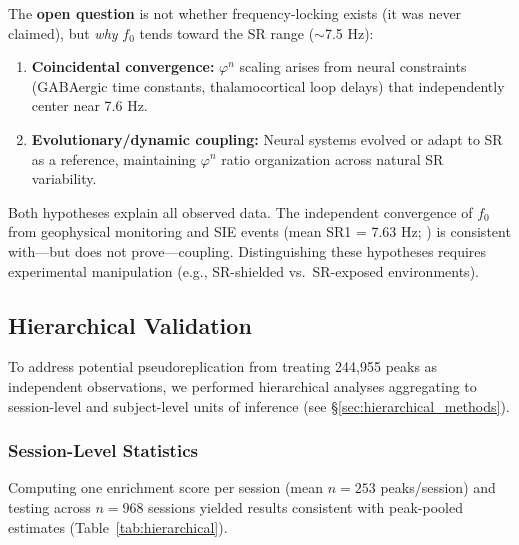 \documentclass[11pt,a4paper]{article}
\newcommand{\phisym}{\varphi}
\newcommand{\fzero}{f_0}
\begin{document}
The \textbf{open question} is not whether frequency-locking exists (it was never claimed), but \textit{why} $\fzero$ tends toward the SR range ($\sim$7.5 Hz):

\begin{enumerate}
    \item \textbf{Coincidental convergence:} $\phisym^n$ scaling arises from neural constraints (GABAergic time constants, thalamocortical loop delays) that independently center near 7.6 Hz.

    \item \textbf{Evolutionary/dynamic coupling:} Neural systems evolved or adapt to SR as a reference, maintaining $\phisym^n$ ratio organization across natural SR variability.
\end{enumerate}

Both hypotheses explain all observed data. The independent convergence of $\fzero$ from geophysical monitoring and SIE events (mean SR1 = 7.63 Hz; \citealt{lacy_sie}) is consistent with---but does not prove---coupling. Distinguishing these hypotheses requires experimental manipulation (e.g., SR-shielded vs.\ SR-exposed environments).

\subsection{Hierarchical Validation}

To address potential pseudoreplication from treating 244,955 peaks as independent observations, we performed hierarchical analyses aggregating to session-level and subject-level units of inference (see \S\ref{sec:hierarchical_methods}).

\subsubsection{Session-Level Statistics}

Computing one enrichment score per session (mean $n = 253$ peaks/session) and testing across $n = 968$ sessions yielded results consistent with peak-pooled estimates (Table~\ref{tab:hierarchical}).
\end{document}
